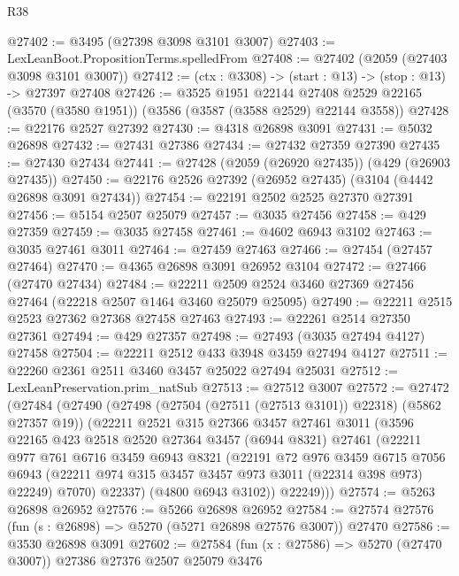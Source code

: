 \begin{lexlean}{R38}
\begin{coremodule}
@27402 := @3495 (@27398 @3098 @3101 @3007)
@27403 := LexLeanBoot.PropositionTerms.spelledFrom
@27408 := @27402 (@2059 (@27403 @3098 @3101 @3007))
@27412 := (ctx : @3308) -> (start : @13) -> (stop : @13) -> @27397 @27408
@27426 := @3525
    @1951
    @22144
    @27408
    @2529
    @22165
    (@3570 (@3580 @1951))
    (@3586 (@3587 (@3588 @2529) @22144 @3558))
@27428 := @22176 @2527 @27392
@27430 := @4318 @26898 @3091
@27431 := @5032 @26898
@27432 := @27431 @27386
@27434 := @27432 @27359 @27390
@27435 := @27430 @27434
@27441 := @27428 (@2059 (@26920 @27435)) (@429 (@26903 @27435))
@27450 := @22176 @2526 @27392 (@26952 @27435) (@3104 (@4442 @26898 @3091 @27434))
@27454 := @22191 @2502 @2525 @27370 @27391
@27456 := @5154 @2507 @25079
@27457 := @3035 @27456
@27458 := @429 @27359
@27459 := @3035 @27458
@27461 := @4602 @6943 @3102
@27463 := @3035 @27461 @3011
@27464 := @27459 @27463
@27466 := @27454 (@27457 @27464)
@27470 := @4365 @26898 @3091 @26952 @3104
@27472 := @27466 (@27470 @27434)
@27484 := @22211 @2509 @2524 @3460 @27369 @27456 @27464 (@22218 @2507 @1464 @3460 @25079 @25095)
@27490 := @22211 @2515 @2523 @27362 @27368 @27458 @27463
@27493 := @22261 @2514 @27350 @27361
@27494 := @429 @27357
@27498 := @27493 (@3035 @27494 @4127) @27458
@27504 := @22211 @2512 @433 @3948 @3459 @27494 @4127
@27511 := @22260 @2361 @2511 @3460 @3457 @25022 @27494 @25031
@27512 := LexLeanPreservation.prim_natSub
@27513 := @27512 @3007
@27572 := @27472
    (@27484
      (@27490
        (@27498 (@27504 (@27511 (@27513 @3101)) @22318) (@5862 @27357 @19))
        (@22211
          @2521
          @315
          @27366
          @3457
          @27461
          @3011
          (@3596
            @22165
            @423
            @2518
            @2520
            @27364
            @3457
            (@6944 @8321)
            @27461
            (@22211
              @977
              @761
              @6716
              @3459
              @6943
              @8321
              (@22191
                @72
                @976
                @3459
                @6715
                @7056
                @6943
                (@22211 @974 @315 @3457 @3457 @973 @3011 (@22314 @398 @973) @22249)
                @7070)
              @22337)
            (@4800 @6943 @3102))
          @22249)))
@27574 := @5263 @26898 @26952
@27576 := @5266 @26898 @26952
@27584 := @27574 @27576 (fun (s : @26898) => @5270 (@5271 @26898 @27576 @3007)) @27470
@27586 := @3530 @26898 @3091
@27602 := @27584
    (fun (x : @27586) => @5270 (@27470 @3007))
    @27386
    @27376
    @2507
    @25079
    @3476

\end{coremodule}
\end{lexlean}
